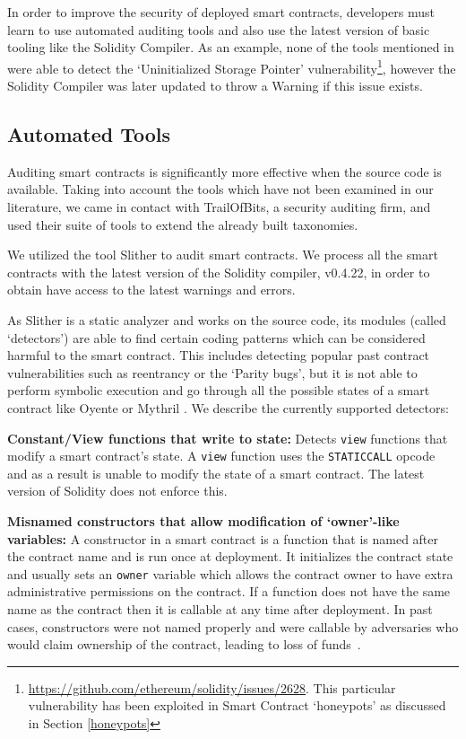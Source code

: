 In order to improve the security of deployed smart contracts, developers must learn to use automated auditing tools and also use the latest version of basic tooling like the Solidity Compiler. As an example, none of the tools mentioned in \cite{tools} were able to detect the `Uninitialized Storage Pointer' vulnerability\footnote{\url{https://github.com/ethereum/solidity/issues/2628}. This particular vulnerability has been exploited in Smart Contract `honeypots' as discussed in Section \ref{honeypots}}, however the Solidity Compiler was later updated to throw a Warning if this issue exists. 

\subsection{Automated Tools}\label{slither}

Auditing smart contracts is significantly more effective when the source code is available. Taking into account the tools which have not been examined in our literature, we came in contact with TrailOfBits, a security auditing firm, and used their suite of tools to extend the already built taxonomies.

We utilized the tool Slither %
to audit smart contracts. We process all the smart contracts with the latest version of the Solidity compiler, v0.4.22, in order to obtain have access to the latest warnings and errors. 

As Slither is a static analyzer and works on the source code, its modules (called `detectors') are able to find certain coding patterns which can be considered harmful to the smart contract. This includes detecting popular past contract vulnerabilities such as reentrancy or the `Parity bugs', but it is not able to perform symbolic execution and go through all the possible states of a smart contract like Oyente \cite{Luu:2016:MSC:2976749.2978309} or Mythril \cite{mythril}. We describe the currently supported detectors:

\textbf{Constant/View functions that write to state:} Detects \texttt{view} functions that modify a smart contract's state. A \texttt{view} %
function uses the \texttt{STATICCALL} opcode \cite{staticcall} and as a result is unable to modify the state of a smart contract. The latest version of Solidity does not enforce this.

\textbf{Misnamed constructors that allow modification of `owner'-like variables:} A constructor in a smart contract is a function that is named after the contract name and is run once at deployment. It initializes the contract state and usually sets an \texttt{owner} variable which allows the contract owner to have extra administrative permissions on the contract. If a function does not have the same name as the contract then it is callable at any time after deployment. In past cases, constructors were not named properly and were callable by adversaries who would claim ownership of the contract, leading to loss of funds~\cite{Atzei:2017:SAE:3080353.3080363}.

